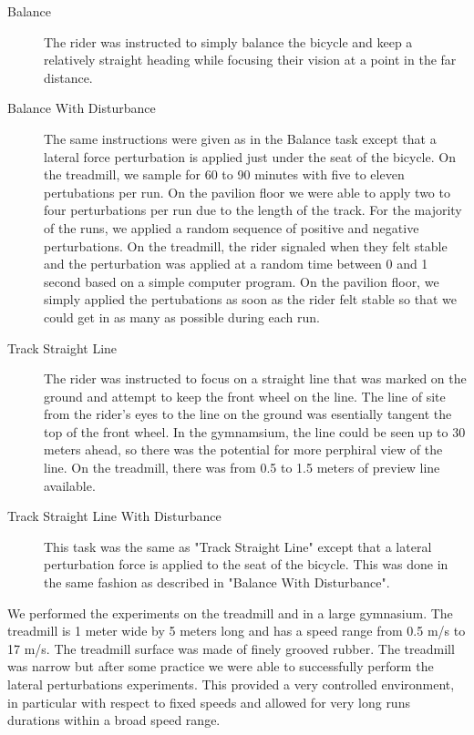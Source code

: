 \documentclass[twocolumn,10pt]{asme2e}
\begin{document}
\begin{description}
	\item[Balance]
		The rider was instructed to simply balance the bicycle and keep a
		relatively straight heading while focusing their vision at a point in the
		far distance.
	\item[Balance With Disturbance]
		The same instructions were given as in the Balance task except that a
		lateral force perturbation is applied just under the seat of the bicycle.
		On the treadmill, we sample for 60 to 90 minutes with five to eleven
		pertubations per run. On the pavilion floor we were able to apply two to
		four perturbations per run due to the length of the track. For the majority
		of the runs, we applied a random sequence of positive and negative
		perturbations.  On the treadmill, the rider signaled when they felt stable
		and the perturbation was applied at a random time between 0 and 1 second
		based on a simple computer program. On the pavilion floor, we simply
		applied the pertubations as soon as the rider felt stable so that we could
		get in as many as possible during each run.
	\item[Track Straight Line]
		The rider was instructed to focus on a straight line that was marked on the
		ground and attempt to keep the front wheel on the line. The line of site
		from the rider's eyes to the line on the ground was esentially tangent the
		top of the front wheel. In the gymnamsium, the line could be seen up to 30
		meters ahead, so there was the potential for more perphiral view of the
		line. On the treadmill, there was from 0.5 to 1.5 meters of preview line
		available.
	\item[Track Straight Line With Disturbance]
		This task was the same as "Track Straight Line" except that a lateral
		perturbation force is applied to the seat of the bicycle. This was done in
		the same fashion as described in "Balance With Disturbance".
\end{description}

We performed the experiments on the treadmill and in a large gymnasium. The
treadmill is 1 meter wide by 5 meters long and has a speed range from 0.5 m/s
to 17 m/s. The treadmill surface was made of finely grooved rubber. The
treadmill was narrow but after some practice we were able to successfully
perform the lateral perturbations experiments. This provided a very controlled
environment, in particular with respect to fixed speeds and allowed for very
long runs durations within a broad speed range.
\end{document}
